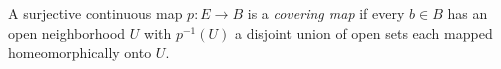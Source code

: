
A surjective continuous map $p:E\to B$ is a \emph{covering map} if every $b\in B$ has an open neighborhood $U$ with $p^{-1}(U)$ a disjoint union of open sets each mapped homeomorphically onto $U$.
